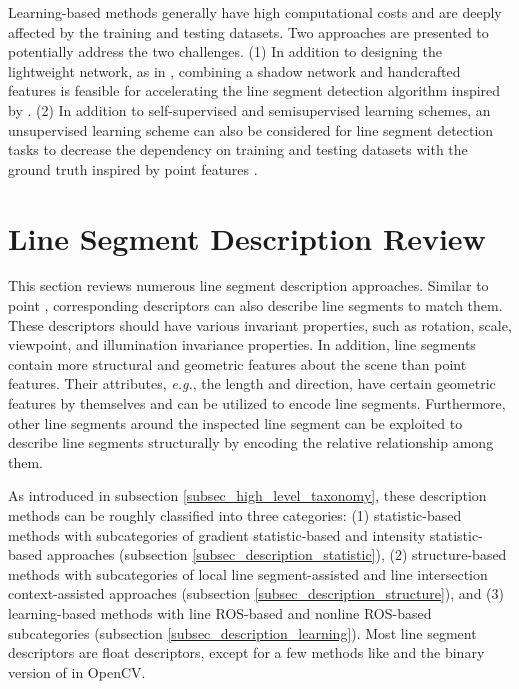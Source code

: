 \documentclass[journal,compsoc]{IEEEtran}
\begin{document}
Learning-based methods generally have high computational costs and are deeply affected by the training and testing datasets. Two approaches are presented to potentially address the two challenges. (1) In addition to designing the lightweight network, as in \cite{TowardsRealtimeandLightweightLineSegmentDetection}, combining a shadow network and handcrafted features is feasible for accelerating the line segment detection algorithm inspired by \cite{KeyNet}. (2) In addition to self-supervised \cite{ELSD} and semisupervised \cite{Hole-robustWireframeDetection} learning schemes, an unsupervised learning scheme can also be considered for line segment detection tasks to decrease the dependency on training and testing datasets with the ground truth inspired by point features \cite{R2D2}.




\section{Line Segment Description Review}
\label{sec_line_description}
This section reviews numerous line segment description approaches. Similar to point \cite{SIFT}, corresponding descriptors can also describe line segments to match them. These descriptors should have various invariant properties, such as rotation, scale, viewpoint, and illumination invariance properties. In addition, line segments contain more structural and geometric features about the scene than point features. Their attributes, \textit{e.g.}, the length and direction, have certain geometric features by themselves and can be utilized to encode line segments. Furthermore, other line segments around the inspected line segment can be exploited to describe line segments structurally by encoding the relative relationship among them.

As introduced in subsection \ref{subsec_high_level_taxonomy}, these description methods can be roughly classified into three categories: (1) statistic-based methods with subcategories of gradient statistic-based and intensity statistic-based approaches (subsection \ref{subsec_description_statistic}), (2) structure-based methods with subcategories of local line segment-assisted and line intersection context-assisted approaches (subsection \ref{subsec_description_structure}), and (3) learning-based methods with line ROS-based and nonline ROS-based subcategories (subsection \ref{subsec_description_learning}). Most line segment descriptors are float descriptors, except for a few methods like \cite{IILB,Abinaryrobustlinedescriptor} and the binary version of \cite{LBD} in OpenCV.
\end{document}
